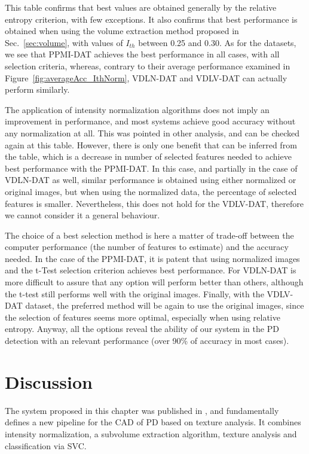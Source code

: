This table confirms that best values are obtained generally by the relative entropy criterion, with few exceptions. It also confirms that best performance is obtained when using the volume extraction method proposed in Sec.~\ref{sec:volume}, with values of $I_{th}$ between 0.25 and 0.30. As for the datasets, we see that PPMI-DAT achieves the best performance in all cases, with all selection criteria, whereas, contrary to their average performance examined in Figure~\ref{fig:averageAcc_IthNorm}, VDLN-DAT and VDLV-DAT can actually perform similarly. 

The application of intensity normalization algorithms does not imply an improvement in performance, and most systems achieve good accuracy without any normalization at all. This was pointed in other analysis, and can be checked again at this table. However, there is only one benefit that can be inferred from the table, which is a decrease in number of selected features needed to achieve best performance with the PPMI-DAT. In this case, and partially in the case of VDLN-DAT as well, similar performance is obtained using either normalized or original images, but when using the normalized data, the percentage of selected features is smaller. Nevertheless, this does not hold for the VDLV-DAT, therefore we cannot consider it a general behaviour. 

The choice of a best selection method is here a matter of trade-off between the computer performance (the number of features to estimate) and the accuracy needed. In the case of the PPMI-DAT, it is patent that using normalized images and the t-Test selection criterion achieves best performance. For VDLN-DAT is more difficult to assure that any option will perform better than others, although the t-test still performs well with the original images. Finally, with the VDLV-DAT dataset, the preferred method will be again to use the original images, since the selection of features seems more optimal, especially when using relative entropy. Anyway, all the options reveal the ability of our system in the PD detection with an relevant performance (over 90\% of accuracy in most cases). 

\section{Discussion}\label{sec:ch5discuss}
The system proposed in this chapter was published in \cite{Martinez-Murcia2013266,martinez2014parametrization}, and fundamentally defines a new pipeline for the \ac{CAD} of \ac{PD} based on texture analysis. It combines intensity normalization, a subvolume extraction algorithm, texture analysis and classification via \ac{SVC}. 

